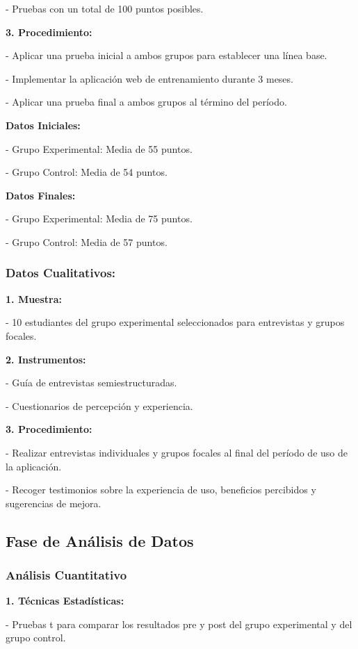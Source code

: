    - Pruebas con un total de 100 puntos posibles.

\textbf{3. Procedimiento:}

   - Aplicar una prueba inicial a ambos grupos para establecer una línea base.
   
   - Implementar la aplicación web de entrenamiento durante 3 meses.
   
   - Aplicar una prueba final a ambos grupos al término del período.

   \textbf{Datos Iniciales:}
   
   - Grupo Experimental: Media de 55 puntos.
   
   - Grupo Control: Media de 54 puntos.

   \textbf{Datos Finales:}
   
   - Grupo Experimental: Media de 75 puntos.
   
   - Grupo Control: Media de 57 puntos.

\subsubsection{Datos Cualitativos:}

\textbf{1. Muestra:}

   - 10 estudiantes del grupo experimental seleccionados para entrevistas y grupos focales.

\textbf{2. Instrumentos:}

   - Guía de entrevistas semiestructuradas.
   
   - Cuestionarios de percepción y experiencia.

\textbf{3. Procedimiento:}

   - Realizar entrevistas individuales y grupos focales al final del período de uso de la aplicación.
   
   - Recoger testimonios sobre la experiencia de uso, beneficios percibidos y sugerencias de mejora.

\subsection{Fase de Análisis de Datos}

\subsubsection{Análisis Cuantitativo}


\textbf{1. Técnicas Estadísticas:}

   - Pruebas t para comparar los resultados pre y post del grupo experimental y del grupo control.
   
